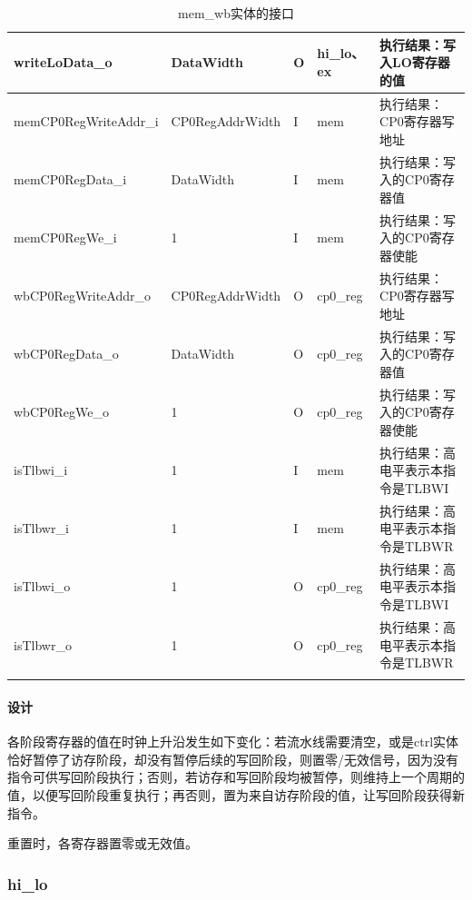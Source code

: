 \documentclass{article}
\begin{document}
\begin{spacing}{1.4}
\begin{longtable}{l|l|l|l|p{5cm}}
\hline writeLoData\_o          & DataWidth              & O     & hi\_lo、ex    & 执行结果：写入LO寄存器的值 \\
\hline memCP0RegWriteAddr\_i   & CP0RegAddrWidth        & I     & mem           & 执行结果：CP0寄存器写地址 \\
\hline memCP0RegData\_i        & DataWidth              & I     & mem           & 执行结果：写入的CP0寄存器值 \\
\hline memCP0RegWe\_i          & 1                      & I     & mem           & 执行结果：写入的CP0寄存器使能 \\
\hline wbCP0RegWriteAddr\_o    & CP0RegAddrWidth        & O     & cp0\_reg      & 执行结果：CP0寄存器写地址 \\
\hline wbCP0RegData\_o         & DataWidth              & O     & cp0\_reg      & 执行结果：写入的CP0寄存器值 \\
\hline wbCP0RegWe\_o           & 1                      & O     & cp0\_reg      & 执行结果：写入的CP0寄存器使能 \\
\hline isTlbwi\_i              & 1                      & I     & mem           & 执行结果：高电平表示本指令是TLBWI \\
\hline isTlbwr\_i              & 1                      & I     & mem           & 执行结果：高电平表示本指令是TLBWR \\
\hline isTlbwi\_o              & 1                      & O     & cp0\_reg      & 执行结果：高电平表示本指令是TLBWI \\
\hline isTlbwr\_o              & 1                      & O     & cp0\_reg      & 执行结果：高电平表示本指令是TLBWR \\
\hline
\caption{mem\_wb实体的接口}
\label{tb:memwb-interface}
\end{longtable}

\paragraph{设计}\mbox{}

各阶段寄存器的值在时钟上升沿发生如下变化：若流水线需要清空，或是ctrl实体恰好暂停了访存阶段，却没有暂停后续的写回阶段，则置零/无效信号，因为没有指令可供写回阶段执行；否则，若访存和写回阶段均被暂停，则维持上一个周期的值，以便写回阶段重复执行；再否则，置为来自访存阶段的值，让写回阶段获得新指令。

重置时，各寄存器置零或无效值。

\subsubsection{hi\_lo}


\end{spacing}
\end{document}
